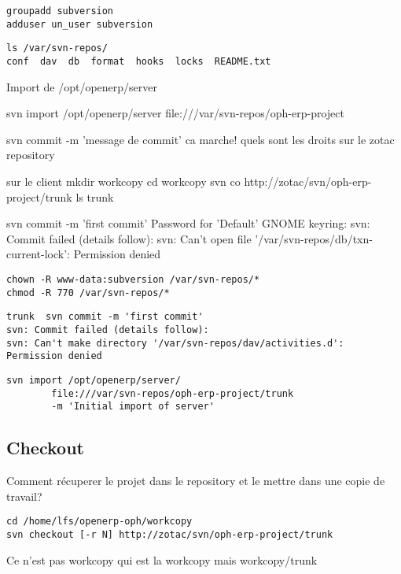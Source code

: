 \documentclass[12pt,a4paper]{article}
\begin{document}
\begin{verbatim}
groupadd subversion
adduser un_user subversion
\end{verbatim}


\begin{verbatim}
ls /var/svn-repos/
conf  dav  db  format  hooks  locks  README.txt
\end{verbatim}

Import de /opt/openerp/server

svn import /opt/openerp/server file:///var/svn-repos/oph-erp-project




svn commit -m 'message de commit'
ca marche! quels sont les droits sur le zotac repository

sur le client 
mkdir workcopy
cd workcopy
svn co http://zotac/svn/oph-erp-project/trunk
ls 
trunk


svn commit -m 'first commit'
Password for 'Default' GNOME keyring: 
svn: Commit failed (details follow):
svn: Can't open file '/var/svn-repos/db/txn-current-lock': Permission denied

\begin{verbatim}
chown -R www-data:subversion /var/svn-repos/*
chmod -R 770 /var/svn-repos/*
\end{verbatim}

\begin{verbatim}
trunk  svn commit -m 'first commit'
svn: Commit failed (details follow):
svn: Can't make directory '/var/svn-repos/dav/activities.d': Permission denied
\end{verbatim}

\begin{verbatim}
svn import /opt/openerp/server/ 
        file:///var/svn-repos/oph-erp-project/trunk 
        -m 'Initial import of server'
\end{verbatim}

\subsection{Checkout}
\label{sec:checkout}

Comment récuperer le projet dans le repository et le mettre dans une copie de travail? 

\begin{verbatim}
cd /home/lfs/openerp-oph/workcopy
svn checkout [-r N] http://zotac/svn/oph-erp-project/trunk
\end{verbatim}

Ce n'est pas workcopy qui est la workcopy mais workcopy/trunk\\
\end{document}

